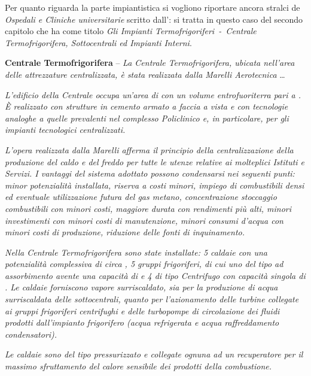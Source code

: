 \noindent Per quanto riguarda la parte impiantistica si vogliono riportare ancora stralci de \emph{Ospedali e Cliniche universitarie} scritto dall': si tratta in questo caso del secondo capitolo che ha come titolo \emph{Gli Impianti Termofrigoriferi~-~\emph{Centrale Termofrigorifera, Sottocentrali ed Impianti Interni}}.
\begin{quoting}
	\textbf{Centrale Termofrigorifera} -- \emph{La Centrale Termofrigorifera, ubicata nell'area delle attrezzature centralizzata, è stata realizzata dalla Marelli Aerotecnica} \dots
		
\sdots 
	
	\emph{L'edificio della Centrale occupa un'area di  con un volume entrofuoriterra pari a . È realizzato con strutture in cemento armato a faccia a vista e con tecnologie analoghe a quelle prevalenti nel complesso Policlinico e, in particolare, per gli impianti tecnologici centralizzati.}
	
	\emph{L'opera realizzata dalla Marelli afferma il principio della centralizzazione della produzione del caldo e del freddo per tutte le utenze relative ai molteplici Istituti e Servizi. I vantaggi del sistema adottato possono condensarsi nei seguenti punti: minor potenzialità installata, riserva a costi minori, impiego di combustibili densi ed eventuale utilizzazione futura del gas metano, concentrazione stoccaggio combustibili con minori costi, maggiore durata con rendimenti più alti, minori investimenti con minori costi di manutenzione, minori consumi d'acqua con minori costi di produzione, riduzione delle fonti di inquinamento.}
	
	\emph{Nella Centrale Termofrigorifera sono state installate: 5 caldaie con una potenzialità complessiva di circa , 5 gruppi frigoriferi, di cui uno del tipo ad assorbimento avente una capacità di  e 4 di tipo Centrifugo con capacità singola di . Le caldaie forniscono vapore surriscaldato, sia per la produzione di acqua surriscaldata delle sottocentrali, quanto per l'azionamento delle turbine collegate ai gruppi frigoriferi centrifughi e delle turbopompe di circolazione dei fluidi prodotti dall'impianto frigorifero (acqua refrigerata e acqua raffreddamento condensatori).}
	
	\emph{Le caldaie sono del tipo pressurizzato e collegate ognuna ad un recuperatore per il massimo sfruttamento del calore sensibile dei prodotti della combustione.}
	

\end{quoting}

